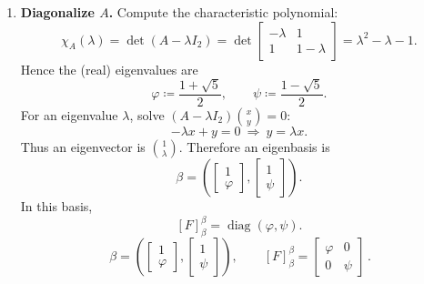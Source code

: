 \documentclass[12pt]{article}
\DeclareMathOperator{\diag}{diag}
\begin{document}
\begin{enumerate}[label=(\alph*)]
\item \textbf{Diagonalize $A$.}
Compute the characteristic polynomial:
\[
\chi_A(\lambda)=\det(A-\lambda I_2)=
\det\begin{bmatrix}-\lambda&1\\1&1-\lambda\end{bmatrix}
=\lambda^2-\lambda-1.
\]
Hence the (real) eigenvalues are
\[
\varphi\coloneqq \frac{1+\sqrt5}{2},
\qquad
\psi\coloneqq \frac{1-\sqrt5}{2}.
\]
For an eigenvalue $\lambda$, solve $(A-\lambda I_2)\binom{x}{y}=0$:
\[
-\lambda x+y=0\ \Rightarrow\ y=\lambda x.
\]
Thus an eigenvector is $\binom{1}{\lambda}$. Therefore an eigenbasis is
\[
\beta=\left(
\begin{bmatrix}1\\ \varphi\end{bmatrix},
\begin{bmatrix}1\\ \psi\end{bmatrix}
\right).
\]
In this basis,
\[
[F]^{\beta}_{\beta}=\diag(\varphi,\psi).
\]
\[
\boxed{\,
\beta=\left(
\begin{bmatrix}1\\ \varphi\end{bmatrix},
\begin{bmatrix}1\\ \psi\end{bmatrix}
\right),\qquad
[F]^{\beta}_{\beta}=
\begin{bmatrix}\varphi&0\\0&\psi\end{bmatrix}
\,}.
\]


\end{enumerate}
\end{document}
